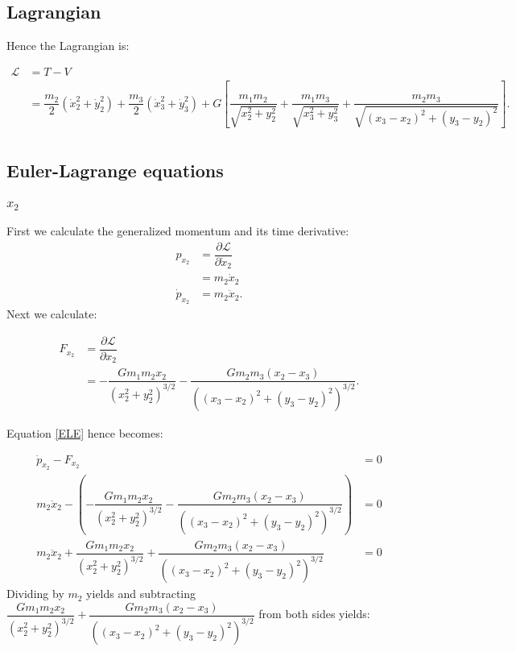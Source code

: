 \documentclass[12pt,a4paper,portrait]{article}
\begin{document}
	\subsection{Lagrangian}
	Hence the Lagrangian is:
	
	\begin{align*}
		\mathcal{L} &= T - V \\
		&= \dfrac{m_2}{2} \left(\dot{x}_2^2 + \dot{y}_2^2\right) + \dfrac{m_3}{2} \left(\dot{x}_3^2 + \dot{y}_3^2\right) + G\left[\dfrac{m_1m_2}{\sqrt{x_2^2+y_2^2}} + \dfrac{m_1 m_3}{\sqrt{x_3^2+y_3^2}} + \dfrac{m_2 m_3}{\sqrt{(x_3-x_2)^2+(y_3-y_2)^2}}\right].\\
	\end{align*}
	
	\subsection{Euler-Lagrange equations}
	\subsubsection{$x_2$}
	First we calculate the generalized momentum and its time derivative:
	\begin{align*}
		p_{x_2} &= \dfrac{\partial \mathcal{L}}{\partial \dot{x}_2} \\
		&= m_2 \dot{x}_2 \\
		\dot{p}_{x_2} &= m_2 \ddot{x}_2.
	\end{align*}
	Next we calculate:
	
	\begin{align*}
		F_{x_2} &= \dfrac{\partial \mathcal{L}}{\partial x_2} \\
		&= -\dfrac{Gm_1 m_2x_2}{\left(x_2^2+y_2^2\right)^{3/2}} -\dfrac{Gm_2m_3(x_2-x_3)}{\left((x_3-x_2)^2+(y_3-y_2)^2\right)^{3/2}}.
	\end{align*}
	
	Equation \eqref{ELE} hence becomes:
	
	\begin{align*}
		\dot{p}_{x_2} - F_{x_2} &= 0\\
		m_2 \ddot{x}_2 - \left(-\dfrac{Gm_1 m_2x_2}{\left(x_2^2+y_2^2\right)^{3/2}} -\dfrac{Gm_2m_3(x_2-x_3)}{\left((x_3-x_2)^2+(y_3-y_2)^2\right)^{3/2}}\right) &= 0 \\
		m_2 \ddot{x}_2 + \dfrac{Gm_1 m_2x_2}{\left(x_2^2+y_2^2\right)^{3/2}} +\dfrac{Gm_2m_3(x_2-x_3)}{\left((x_3-x_2)^2+(y_3-y_2)^2\right)^{3/2}} &= 0
	\end{align*}
	Dividing by $m_2$ yields and subtracting $\dfrac{Gm_1 m_2x_2}{\left(x_2^2+y_2^2\right)^{3/2}} +\dfrac{Gm_2m_3(x_2-x_3)}{\left((x_3-x_2)^2+(y_3-y_2)^2\right)^{3/2}}$ from both sides yields:
	
\end{document}

